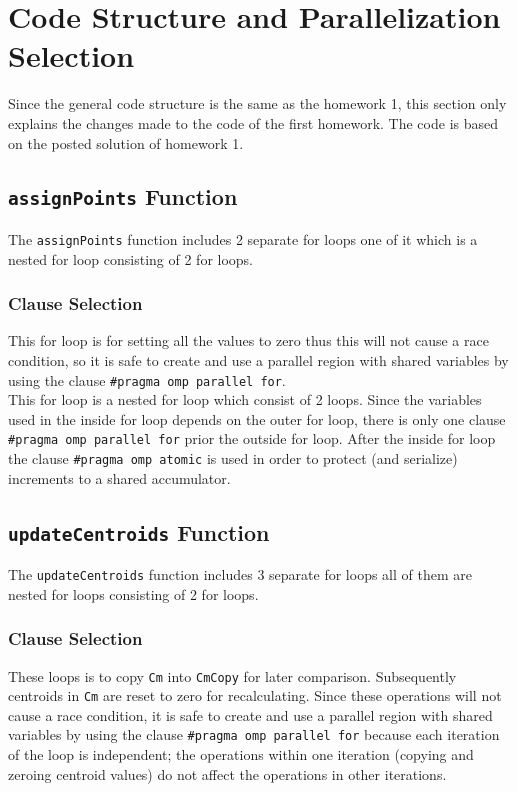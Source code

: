 \section{Code Structure and Parallelization Selection}
Since the general code structure is the same as the homework 1, this section only explains the changes made to the code of the first homework. The code is based on the posted solution of homework 1.

\subsection{\texttt{assignPoints} Function}
The \texttt{assignPoints} function includes 2 separate for loops one of it which is a nested for loop consisting of 2 for loops. 

\subsubsection{Clause Selection}

This for loop is for setting all the values to zero thus this will not cause a race condition, so it is safe to create and use a parallel region with shared variables by using the clause \texttt{\#pragma omp parallel for}. \\

 
This for loop is a nested for loop which consist of 2 loops. Since the variables used in the inside for loop depends on the outer for loop, there is only one clause \texttt{\#pragma omp parallel for} prior the outside for loop. After the inside for loop the clause \texttt{\#pragma omp atomic} is used in order to protect (and serialize) increments to a shared accumulator. 


\subsection{\texttt{updateCentroids} Function}
The \texttt{updateCentroids} function includes 3 separate for loops all of them are nested for loops consisting of 2 for loops. 

\subsubsection{Clause Selection}

These loops is to copy \texttt{Cm} into \texttt{CmCopy} for later comparison. Subsequently centroids in \texttt{Cm} are reset to zero for recalculating. Since these operations will not cause a race condition, it is safe to create and use a parallel region with shared variables by using the clause \texttt{\#pragma omp parallel for} because each iteration of the loop is independent; the operations within one iteration (copying and zeroing centroid values) do not affect the operations in other iterations. \\

